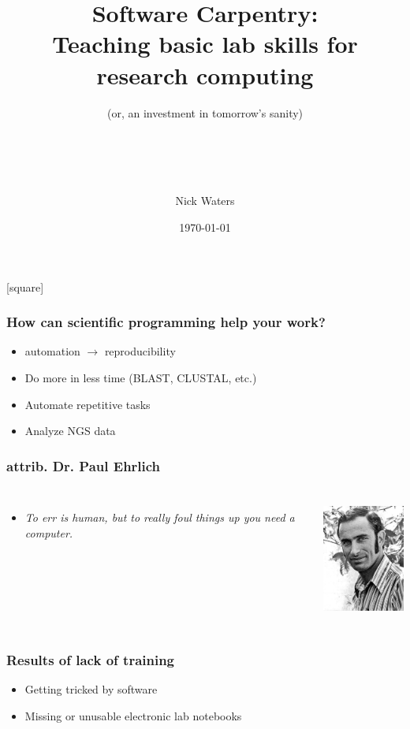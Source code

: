 \documentclass[10pt, compress, aspectratio=43]{beamer}
\title{Software Carpentry: \\Teaching basic lab skills for research computing}
\subtitle{{\small (or, an investment in tomorrow's sanity)}}
\date{\footnotesize{ \today}}
\author{
\\ \\ \\ \\ \large{Nick Waters}}
\institute{}
\begin{document}
\maketitle

{}[square]

\begin{frame}[fragile]
  \frametitle{How can scientific programming help your work?}

  \begin{itemize}[<+- | alert@+>]
  \item automation $\rightarrow$ reproducibility
  \item Do more in less time (BLAST, CLUSTAL, etc.)
  \item Automate repetitive tasks
  \item Analyze NGS data
  \end{itemize}
\end{frame}


\begin{frame}
  \frametitle{attrib. Dr. Paul Ehrlich}
      \begin{columns}[onlytextwidth]
        \begin{itemize}
        \item<2- > \textit{To err is human, but to really foul things up you need a computer.}
        \end{itemize}
        \includegraphics[height=4cm]{./frequentFigs/Paul_Ehrlich.jpg}
        \end{columns}
  \end{frame}


\begin{frame}[fragile]
  \frametitle{Results of lack of training}
  \begin{itemize}[<+- | alert@+>]
  \item Getting tricked by software
  \item Missing or unusable electronic lab notebooks
  \end{itemize}
\end{frame}
\end{document}
